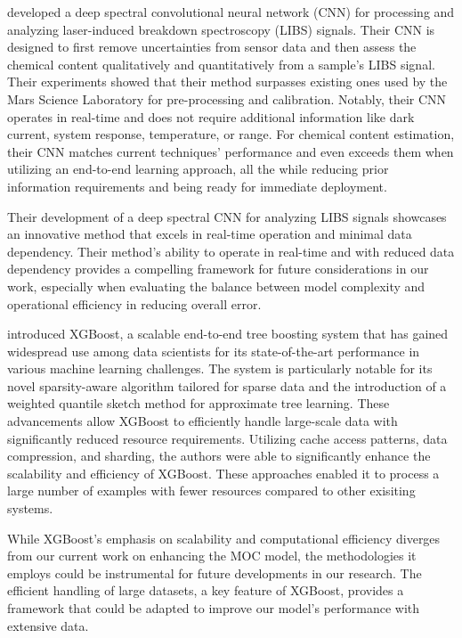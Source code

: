 \citeauthor{castorena_deep_2021} developed a deep spectral convolutional neural network (CNN) for processing and analyzing laser-induced breakdown spectroscopy (LIBS) signals.
Their CNN is designed to first remove uncertainties from sensor data and then assess the chemical content qualitatively and quantitatively from a sample's LIBS signal.
Their experiments showed that their method surpasses existing ones used by the Mars Science Laboratory for pre-processing and calibration.
Notably, their CNN operates in real-time and does not require additional information like dark current, system response, temperature, or range.
For chemical content estimation, their CNN matches current techniques' performance and even exceeds them when utilizing an end-to-end learning approach, all the while reducing prior information requirements and being ready for immediate deployment\cite{castorena_deep_2021}.

Their development of a deep spectral CNN for analyzing LIBS signals showcases an innovative method that excels in real-time operation and minimal data dependency. Their method's ability to operate in real-time and with reduced data dependency provides a compelling framework for future considerations in our work, especially when evaluating the balance between model complexity and operational efficiency in reducing overall error.

\citeauthor{chen_xgboost_2016} introduced XGBoost, a scalable end-to-end tree boosting system that has gained widespread use among data scientists for its state-of-the-art performance in various machine learning challenges. The system is particularly notable for its novel sparsity-aware algorithm tailored for sparse data and the introduction of a weighted quantile sketch method for approximate tree learning. These advancements allow XGBoost to efficiently handle large-scale data with significantly reduced resource requirements. Utilizing cache access patterns, data compression, and sharding, the authors were able to significantly enhance the scalability and efficiency of XGBoost. These approaches enabled it to process a large number of examples with fewer resources compared to other exisiting systems\cite{chen_xgboost_2016}.

While XGBoost's emphasis on scalability and computational efficiency diverges from our current work on enhancing the MOC model, the methodologies it employs could be instrumental for future developments in our research. The efficient handling of large datasets, a key feature of XGBoost, provides a framework that could be adapted to improve our model's performance with extensive data.
